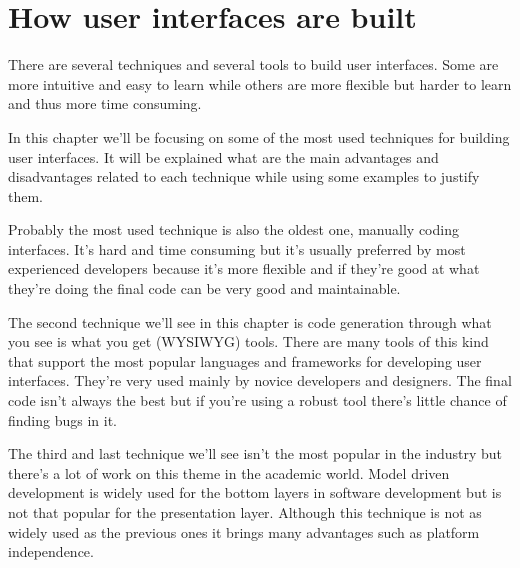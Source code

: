 \section{How user interfaces are built}
\label{section:How_user_interfaces_are_built}
There are several techniques and several tools to build user interfaces. Some are more intuitive and easy to learn while others are more flexible but harder to learn and thus more time consuming.

In this chapter we'll be focusing on some of the most used techniques for building user interfaces. It will be explained what are the main advantages and disadvantages related to each technique while using some examples to justify them.

Probably the most used technique is also the oldest one, manually coding interfaces. It's hard and time consuming but it's usually preferred by most experienced developers because it's more flexible and if they're good at what they're doing the final code can be very good and maintainable.

The second technique we'll see in this chapter is code generation through what you see is what you get (WYSIWYG) tools. There are many tools of this kind that support the most popular languages and frameworks for developing user interfaces. They're very used mainly by novice developers and designers. The final code isn't always the best but if you're using a robust tool there's little chance of finding bugs in it.

The third and last technique we'll see isn't the most popular in the industry but there's a lot of work on this theme in the academic world. Model driven development is widely used for the bottom layers in software development but is not that popular for the presentation layer. Although this technique is not as widely used as the previous ones it brings many advantages such as platform independence.




